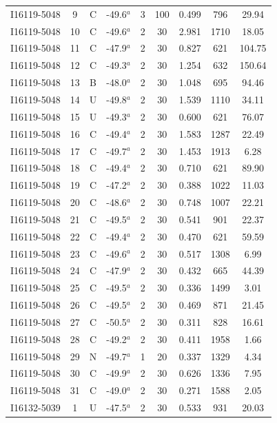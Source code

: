 \begin{table}
\begin{tabular}{ccccccccc}
I16119-5048 & 9 & C & -49.6$^{a}$ & 3 & 100 & 0.499 & 796 & 29.94 \\
I16119-5048 & 10 & C & -49.6$^{a}$ & 2 & 30 & 2.981 & 1710 & 18.05 \\
I16119-5048 & 11 & C & -47.9$^{a}$ & 2 & 30 & 0.827 & 621 & 104.75 \\
I16119-5048 & 12 & C & -49.3$^{a}$ & 2 & 30 & 1.254 & 632 & 150.64 \\
I16119-5048 & 13 & B & -48.0$^{a}$ & 2 & 30 & 1.048 & 695 & 94.46 \\
I16119-5048 & 14 & U & -49.8$^{a}$ & 2 & 30 & 1.539 & 1110 & 34.11 \\
I16119-5048 & 15 & U & -49.3$^{a}$ & 2 & 30 & 0.600 & 621 & 76.07 \\
I16119-5048 & 16 & C & -49.4$^{a}$ & 2 & 30 & 1.583 & 1287 & 22.49 \\
I16119-5048 & 17 & C & -49.7$^{a}$ & 2 & 30 & 1.453 & 1913 & 6.28 \\
I16119-5048 & 18 & C & -49.4$^{a}$ & 2 & 30 & 0.710 & 621 & 89.90 \\
I16119-5048 & 19 & C & -47.2$^{a}$ & 2 & 30 & 0.388 & 1022 & 11.03 \\
I16119-5048 & 20 & C & -48.6$^{a}$ & 2 & 30 & 0.748 & 1007 & 22.21 \\
I16119-5048 & 21 & C & -49.5$^{a}$ & 2 & 30 & 0.541 & 901 & 22.37 \\
I16119-5048 & 22 & C & -49.4$^{a}$ & 2 & 30 & 0.470 & 621 & 59.59 \\
I16119-5048 & 23 & C & -49.6$^{a}$ & 2 & 30 & 0.517 & 1308 & 6.99 \\
I16119-5048 & 24 & C & -47.9$^{a}$ & 2 & 30 & 0.432 & 665 & 44.39 \\
I16119-5048 & 25 & C & -49.5$^{a}$ & 2 & 30 & 0.336 & 1499 & 3.01 \\
I16119-5048 & 26 & C & -49.5$^{a}$ & 2 & 30 & 0.469 & 871 & 21.45 \\
I16119-5048 & 27 & C & -50.5$^{a}$ & 2 & 30 & 0.311 & 828 & 16.61 \\
I16119-5048 & 28 & C & -49.2$^{a}$ & 2 & 30 & 0.411 & 1958 & 1.66 \\
I16119-5048 & 29 & N & -49.7$^{a}$ & 1 & 20 & 0.337 & 1329 & 4.34 \\
I16119-5048 & 30 & C & -49.9$^{a}$ & 2 & 30 & 0.626 & 1336 & 7.95 \\
I16119-5048 & 31 & C & -49.0$^{a}$ & 2 & 30 & 0.271 & 1588 & 2.05 \\
I16132-5039 & 1 & U & -47.5$^{a}$ & 2 & 30 & 0.533 & 931 & 20.03 \\

\end{tabular}
\end{table}
